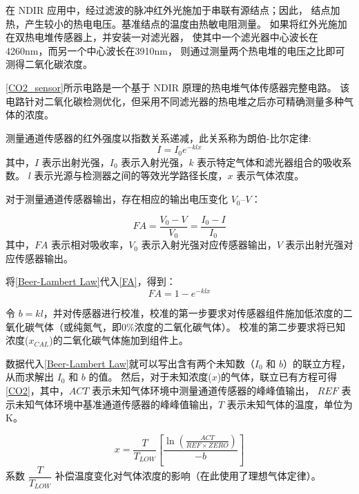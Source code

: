 \documentclass[12pt,hyperref,a4paper,UTF8]{ctexart}
\begin{document}
在 NDIR 应用中，经过滤波的脉冲红外光施加于串联有源结点；因此，
结点加热，产生较小的热电电压。基准结点的温度由热敏电阻测量。
如果将红外光施加在双热电堆传感器上，并安装一对滤光器，
使其中一个滤光器中心波长在4260\unit{nm}，而另一个中心波长在3910\unit{nm}，
则通过测量两个热电堆的电压之比即可测得二氧化碳浓度。

\autoref{CO2_sensor}所示电路是一个基于 NDIR 原理的热电堆气体传感器完整电路。
该电路针对二氧化碳检测优化，但采用不同滤光器的热电堆之后亦可精确测量多种气体的浓度。

测量通道传感器的红外强度以指数关系递减，此关系称为朗伯-比尔定律:
\begin{equation}
    I = I_0 e^{-k l x}
    \label{Beer-Lambert Law}
\end{equation}
其中，$I$ 表示出射光强，$I_0$ 表示入射光强，$k$ 表示特定气体和滤光器组合的吸收系数。
$l$ 表示光源与检测器之间的等效光学路径长度，$x$ 表示气体浓度。

对于测量通道传感器输出，存在相应的输出电压变化 $V_0–V$：

\begin{equation}
    FA=\frac{V_0 - V}{V_0}=\frac{I_0 - I}{I_0}
    \label{FA}
\end{equation}
其中，$FA$ 表示相对吸收率，$V_0$ 表示入射光强对应传感器输出，$V$ 表示出射光强对应传感器输出。

将\autoref{Beer-Lambert Law}代入\autoref{FA}，得到：
\begin{equation}
    FA=1-e^{-k l x}
\end{equation}

令 $b=kl$，并对传感器进行校准，校准的第一步要求对传感器组件施加低浓度的二氧化碳气体（或纯氮气，即$0\%$浓度的二氧化碳气体）。
校准的第二步要求将已知浓度($x_{CAL}$)的二氧化碳气体施加到组件上。

数据代入\autoref{Beer-Lambert Law}就可以写出含有两个未知数（$I_0$ 和 $b$）的联立方程，从而求解出 $I_0$ 和 $b$ 的值。
然后，对于未知浓度($x$)的气体，联立已有方程可得\autoref{CO2}，其中，$ACT$ 表示未知气体环境中测量通道传感器的峰峰值输出，
$REF$ 表示未知气体环境中基准通道传感器的峰峰值输出，$T$ 表示未知气体的温度，单位为 \unit{\kelvin}。

\begin{equation}
    x=\frac{T}{T_{LOW}}\left[\frac{\ln \left(\frac{ACT}{REF\times ZERO}\right)}{-b}\right]
    \label{CO2}
\end{equation}
系数 $\dfrac{T}{T_{LOW}}$ 补偿温度变化对气体浓度的影响（在此使用了理想气体定律）。
\end{document}
